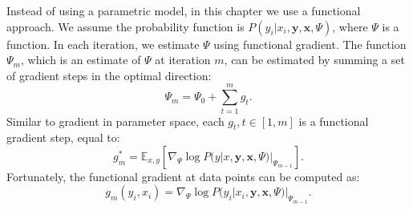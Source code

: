 \documentclass[12pt]{article}
\begin{document}
	Instead of using a parametric model, in this chapter we use a functional approach. We assume the probability function is $P(y_i | x_i, \mathbf{y}, \mathbf{x}, \Psi)$, where $\Psi$ is a function. In each iteration, we estimate $\Psi$ using functional gradient. The function $\Psi_m$, which is an estimate of $\Psi$ at iteration $m$, can be estimated by summing a set of gradient steps in the optimal direction:
	\begin{equation}
		\Psi_m = \Psi_0 + \sum_{t=1}^{m} g_t.
	\end{equation}
	Similar to gradient in parameter space, each $g_t, t \in [1, m]$ is a functional gradient step, equal to:
	\begin{equation}
		g_m^* = \mathbb{E}_{x,y} [ \nabla_\Psi \log P(y | x, \mathbf{y}, \mathbf{x}, \Psi) |_{\Psi_{m-1}} ].
	\end{equation}
	Fortunately, the functional gradient at data points can be computed as:
	\begin{equation}
		g_m(y_i, x_i) = \nabla_\Psi \log P(y_i | x_i, \mathbf{y}, \mathbf{x}, \Psi) |_{\Psi_{m-1}}.
	\end{equation}
	
\end{document}
